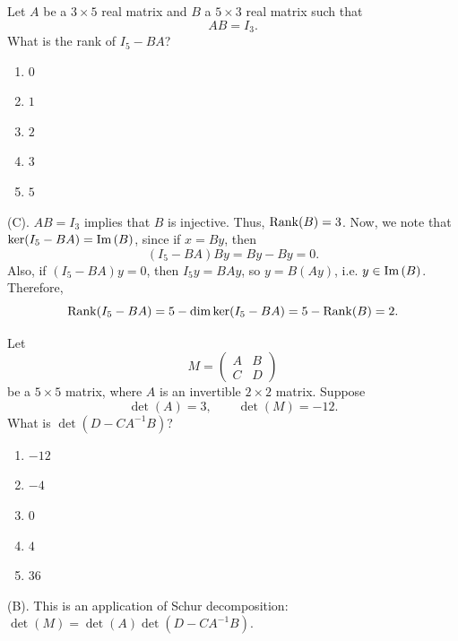 \begin{exercise}
Let $A$ be a $3\times5$ real matrix and $B$ a
$5\times3$ real matrix such that
\[
AB=I_3.
\]
What is the rank of $I_5-BA$?
\begin{enumerate}[label=(\Alph*)]
    \item $0$
    \item $1$
    \item $2$
    \item $3$
    \item $5$
\end{enumerate}
\end{exercise}
\begin{solution}
(C). $AB = I_3$ implies that $B$ is injective. Thus, $\mathrm{Rank}(B) = 3$. Now, 
we note that $\ker(I_5 - BA) = \text{Im\,}(B)$, since if $x = By$, then 
\[
(I_5 - BA)By = By - By = 0. 
\]
Also, if $(I_5 - BA)y = 0$, then $I_5y = BAy$, so $y= B(Ay)$, i.e. $y \in \text{Im\,} (B)$.
Therefore, 
\[
\mathrm{Rank}(I_5 - BA) = 5 - \dim \ker(I_5 - BA) = 5 - \mathrm{Rank}(B) = 2.
\]
\end{solution}

\begin{exercise}
Let
\[
M=\begin{pmatrix}A&B\\C&D\end{pmatrix}
\]
be a $5\times5$ matrix, where $A$ is an invertible $2\times2$ matrix. Suppose
\[
\det(A)=3,\qquad \det(M)=-12.
\]
What is $\det(D-CA^{-1}B)$?
\begin{enumerate}[label=(\Alph*)]
    \item $-12$
    \item $-4$
    \item $0$
    \item $4$
    \item $36$
\end{enumerate}
\end{exercise}
\begin{solution}
(B). This is an application of Schur decomposition: $\det(M) = \det(A) \det(D - CA^{-1}B)$.
\end{solution}

